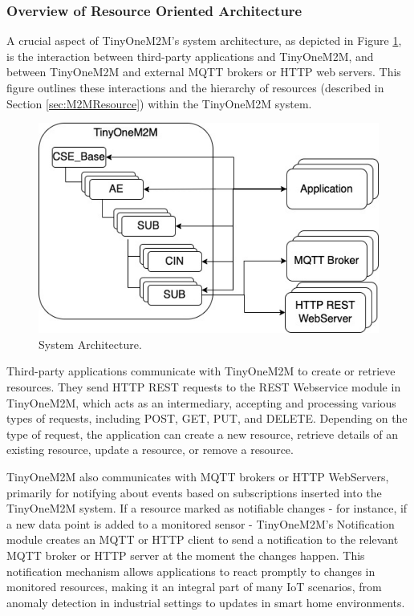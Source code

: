\documentclass[a4paper,fleqn]{cas-dc}
\begin{document}
\subsubsection{Overview of Resource Oriented Architecture}

A crucial aspect of TinyOneM2M's system architecture, as depicted in Figure \ref{fig:systemarchitecture}, is the interaction between third-party applications and TinyOneM2M, and between TinyOneM2M and external MQTT brokers or HTTP web servers. This figure outlines these interactions and the hierarchy of resources (described in Section \ref{sec:M2MResource}) within the TinyOneM2M system.

\begin{figure}[h]
	\centering
	\includegraphics[width=\linewidth]{SystemArchitectuRE.jpg}
	\caption{System Architecture.}
	\label{fig:systemarchitecture}
\end{figure}

Third-party applications communicate with TinyOneM2M to create or retrieve resources. They send HTTP REST requests to the REST Webservice module in TinyOneM2M, which acts as an intermediary, accepting and processing various types of requests, including POST, GET, PUT, and DELETE. Depending on the type of request, the application can create a new resource, retrieve details of an existing resource, update a resource, or remove a resource.

TinyOneM2M also communicates with MQTT brokers or HTTP WebServers, primarily for notifying about events based on subscriptions inserted into the TinyOneM2M system. If a resource marked as notifiable changes - for instance, if a new data point is added to a monitored sensor - TinyOneM2M's Notification module creates an MQTT or HTTP client to send a notification to the relevant MQTT broker or HTTP server at the moment the changes happen. This notification mechanism allows applications to react promptly to changes in monitored resources, making it an integral part of many IoT scenarios, from anomaly detection in industrial settings to updates in smart home environments.
\end{document}

